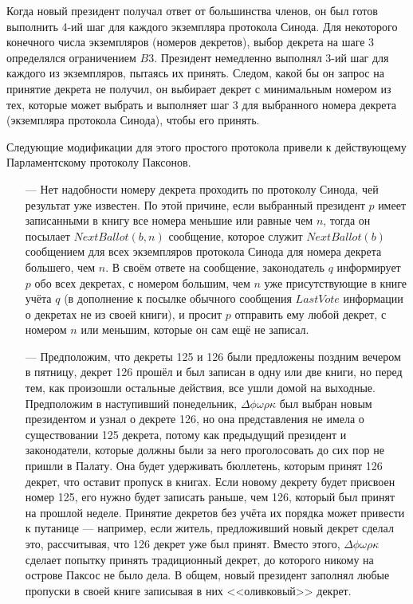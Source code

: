 \documentclass[12pt, a4paper]{article} %
\begin{document}
Когда новый президент получал ответ от большинства членов, он был готов выполнить 4-ий шаг для каждого экземпляра протокола Синода. Для некоторого конечного числа экземпляров (номеров декретов), выбор декрета на шаге 3 определялся ограничением $B3$. Президент немедленно выполнял 3-ий шаг для каждого из экземпляров, пытаясь их принять. Следом, какой бы он запрос на принятие декрета не получил, он выбирает декрет с минимальным номером из тех, которые может выбрать и выполняет шаг 3 для выбранного номера декрета (экземпляра протокола Синода), чтобы его принять.

Следующие модификации для этого простого протокола привели к действующему Парламентскому протоколу Паксонов.

\begin{itemize}
    \item[---] Нет надобности номеру декрета проходить по протоколу Синода, чей результат уже известен. По этой причине, если выбранный президент $p$ имеет записанными в книгу все номера меньшие или равные чем $n$, тогда он посылает $NextBallot(b,n)$ сообщение, которое служит $NextBallot(b)$ сообщением для всех экземпляров протокола Синода для номера декрета большего, чем $n$. В своём ответе на сообщение, законодатель $q$ информирует $p$ обо всех декретах, с номером большим, чем $n$ уже присутствующие в книге учёта $q$ (в дополнение к посылке обычного сообщения $LastVote$ информации о декретах не из своей книги), и просит $p$ отправить ему любой декрет, с номером $n$ или меньшим, которые он сам ещё не записал.

    \item[---] Предположим, что декреты 125 и 126 были предложены поздним вечером в пятницу, декрет 126 прошёл и был записан в одну или две книги, но перед тем, как произошли остальные действия, все ушли домой на выходные. Предположим в наступивший понедельник, $\Delta\phi\omega\rho\kappa$ был выбран новым президентом и узнал о декрете 126, но она представления не имела о существовании 125 декрета, потому как предыдущий президент и законодатели, которые должны были за него проголосовать до сих пор не пришли в Палату. Она будет удерживать бюллетень, которым принят 126 декрет, что оставит пропуск в книгах. Если новому декрету будет присвоен номер 125, его нужно будет записать раньше, чем 126, который был принят на прошлой неделе. Принятие декретов без учёта их порядка может привести к путанице --- например, если житель, предложивший новый декрет сделал это, рассчитывая, что 126 декрет уже был принят. Вместо этого, $\Delta\phi\omega\rho\kappa$ сделает попытку принять 
традиционный декрет, до которого никому на острове Паксос не было дела. В общем, новый президент заполнял любые пропуски в своей книге записывая в них <<оливковый>> декрет.
\end{itemize}
\end{document}
